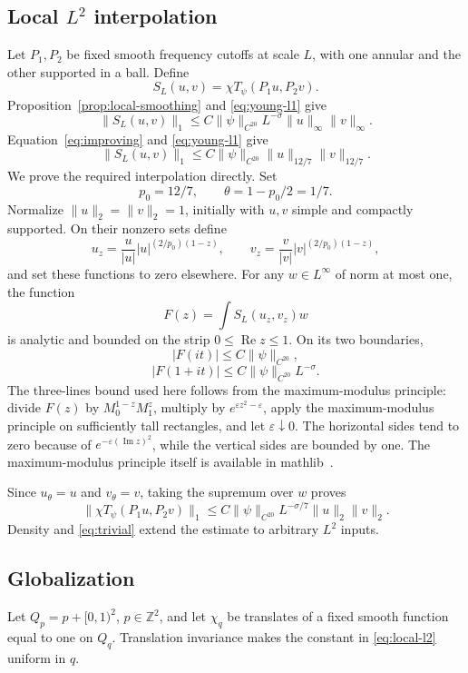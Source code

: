 \documentclass[11pt,a4paper]{article}
\newcommand{\Z}{\mathbb Z}
\begin{document}
\subsection{Local \texorpdfstring{$L^2$}{L2} interpolation}

Let $P_1,P_2$ be fixed smooth frequency cutoffs at scale $L$, with one
annular and the other supported in a ball. Define
\[
S_L(u,v)=\chi T_\psi(P_1u,P_2v).
\]
Proposition~\ref{prop:local-smoothing} and \eqref{eq:young-l1} give
\[
\|S_L(u,v)\|_1
\leq C\|\psi\|_{C^{20}}L^{-\sigma}\|u\|_\infty\|v\|_\infty.
\tag{7.1}\label{eq:interpolation-upper}
\]
Equation~\eqref{eq:improving} and \eqref{eq:young-l1} give
\[
\|S_L(u,v)\|_1
\leq C\|\psi\|_{C^{20}}\|u\|_{12/7}\|v\|_{12/7}.
\tag{7.2}\label{eq:interpolation-lower}
\]
We prove the required interpolation directly. Set
\[
p_0=12/7,\qquad\theta=1-p_0/2=1/7.
\]
Normalize $\|u\|_2=\|v\|_2=1$, initially with $u,v$ simple and compactly
supported. On their nonzero sets define
\[
u_z=\frac{u}{|u|}|u|^{(2/p_0)(1-z)},\qquad
v_z=\frac{v}{|v|}|v|^{(2/p_0)(1-z)},
\]
and set these functions to zero elsewhere. For any $w\in L^\infty$ of
norm at most one, the function
\[
F(z)=\int S_L(u_z,v_z)w
\]
is analytic and bounded on the strip $0\leq\operatorname{Re}z\leq1$.
On its two boundaries,
\[
|F(it)|\leq C\|\psi\|_{C^{20}},
\]
\[
|F(1+it)|\leq C\|\psi\|_{C^{20}}L^{-\sigma}.
\]
The three-lines bound used here follows from the maximum-modulus
principle: divide $F(z)$ by $M_0^{1-z}M_1^z$, multiply by
$e^{\varepsilon z^2-\varepsilon}$, apply the maximum-modulus principle on
sufficiently tall rectangles, and let $\varepsilon\downarrow0$. The
horizontal sides tend to zero because of
$e^{-\varepsilon(\operatorname{Im}z)^2}$, while the vertical sides are
bounded by one. The maximum-modulus principle itself is available in
mathlib~\cite{mathlib-maximum}.

Since $u_\theta=u$ and $v_\theta=v$, taking the supremum over $w$ proves
\[
\|\chi T_\psi(P_1u,P_2v)\|_1
\leq C\|\psi\|_{C^{20}}L^{-\sigma/7}\|u\|_2\|v\|_2.
\tag{7.3}\label{eq:local-l2}
\]
Density and \eqref{eq:trivial} extend the estimate to arbitrary $L^2$ inputs.

\subsection{Globalization}

Let $Q_p=p+[0,1)^2$, $p\in\Z^2$, and let $\chi_q$ be translates of a
fixed smooth function equal to one on $Q_q$. Translation invariance makes
the constant in \eqref{eq:local-l2} uniform in $q$.
\end{document}

